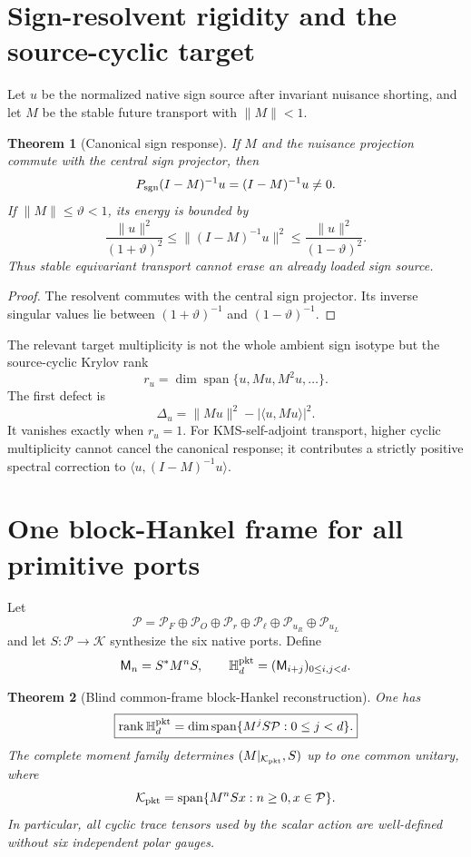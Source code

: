 \documentclass[11pt,oneside,openany]{book}
\numberwithin{equation}{chapter}
\newtheorem{theorem}{Theorem}[chapter]
\theoremstyle{definition}
\theoremstyle{remark}
\newcommand{\rank}{\operatorname{rank}}
\newcommand{\Span}{\operatorname{span}}
\begin{document}
\section{Sign-resolvent rigidity and the source-cyclic target}
Let \(u\) be the normalized native sign source after invariant nuisance
shorting, and let \(M\) be the stable future transport with \(\|M\|<1\).

\begin{theorem}[Canonical sign response]
\label{thm:v5-sign-response}
If \(M\) and the nuisance projection commute with the central sign projector,
then
\[
 P_{\rm sgn}(I-M)^{-1}u=(I-M)^{-1}u\ne0.
\]
If \(\|M\|\le\vartheta<1\), its energy is bounded by
\[
 \boxed{
 \frac{\|u\|^2}{(1+\vartheta)^2}
 \le\|(I-M)^{-1}u\|^2
 \le\frac{\|u\|^2}{(1-\vartheta)^2}.}
\]
Thus stable equivariant transport cannot erase an already loaded sign source.
\end{theorem}

\begin{proof}
The resolvent commutes with the central sign projector.  Its inverse singular
values lie between \((1+\vartheta)^{-1}\) and
\((1-\vartheta)^{-1}\).
\end{proof}

The relevant target multiplicity is not the whole ambient sign isotype but the
source-cyclic Krylov rank
\[
 r_u=\dim\Span\{u,Mu,M^2u,\ldots\}.
\]
The first defect is
\[
 \boxed{
 \Delta_u=\|Mu\|^2-|\langle u,Mu\rangle|^2.}
\]
It vanishes exactly when \(r_u=1\).  For KMS-self-adjoint transport, higher
cyclic multiplicity cannot cancel the canonical response; it contributes a
strictly positive spectral correction to
\(\langle u,(I-M)^{-1}u\rangle\).

\section{One block-Hankel frame for all primitive ports}
Let
\[
 \mathcal P
 =\mathcal P_F\oplus\mathcal P_O\oplus\mathcal P_r
 \oplus\mathcal P_\ell\oplus\mathcal P_{u_R}\oplus\mathcal P_{u_L}
\]
and let \(S:\mathcal P\to\mathcal K\) synthesize the six native ports.  Define
\[
 \mathsf M_n=S^*M^nS,
 \qquad
 \mathbb H_d^{\rm pkt}
 =(\mathsf M_{i+j})_{0\le i,j<d}.
\]

\begin{theorem}[Blind common-frame block-Hankel reconstruction]
\label{thm:v5-block-hankel-packet}
One has
\[
 \boxed{
 \rank\mathbb H_d^{\rm pkt}
 =\dim\Span\{M^jS\mathcal P:0\le j<d\}.}
\]
The complete moment family determines
\((M|_{\mathcal K_{\rm pkt}},S)\) up to one common unitary, where
\[
 \mathcal K_{\rm pkt}=\Span\{M^nSx:n\ge0,x\in\mathcal P\}.
\]
In particular, all cyclic trace tensors used by the scalar action are
well-defined without six independent polar gauges.
\end{theorem}
\end{document}
